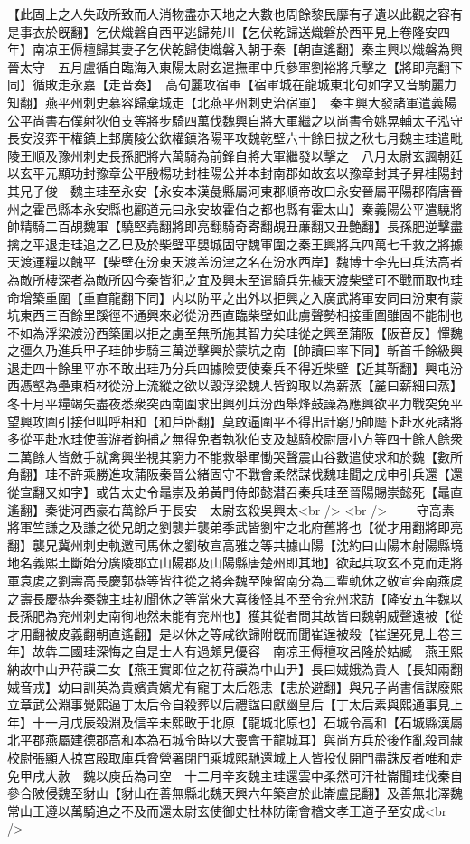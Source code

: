 【此固上之人失政所致而人消物盡亦天地之大數也周餘黎民靡有孑遺以此觀之容有是事衣於旣翻】乞伏熾磐自西平逃歸苑川【乞伏乾歸送熾磐於西平見上卷隆安四年】南凉王傉檀歸其妻子乞伏乾歸使熾磐入朝于秦【朝直遙翻】秦主興以熾磐為興晉太守　五月盧循自臨海入東陽太尉玄遣撫軍中兵參軍劉裕將兵擊之【將即亮翻下同】循敗走永嘉【走音奏】　高句麗攻宿軍【宿軍城在龍城東北句如字又音駒麗力知翻】燕平州刺史慕容歸棄城走【北燕平州刺史治宿軍】　秦主興大發諸軍遣義陽公平尚書右僕射狄伯支等將步騎四萬伐魏興自將大軍繼之以尚書令姚晃輔太子泓守長安沒弈干權鎮上邽廣陵公欽權鎮洛陽平攻魏乾壁六十餘日拔之秋七月魏主珪遣毗陵王順及豫州刺史長孫肥將六萬騎為前鋒自將大軍繼發以擊之　八月太尉玄諷朝廷以玄平元顯功封豫章公平殷楊功封桂陽公并本封南郡如故玄以豫章封其子昇桂陽封其兄子俊　魏主珪至永安【永安本漢彘縣屬河東郡順帝改曰永安晉屬平陽郡隋唐晉州之霍邑縣本永安縣也酈道元曰永安故霍伯之都也縣有霍太山】秦義陽公平遣驍將帥精騎二百覘魏軍【驍堅堯翻將即亮翻騎奇寄翻覘丑亷翻又丑艶翻】長孫肥逆擊盡擒之平退走珪追之乙巳及於柴壁平嬰城固守魏軍圍之秦王興將兵四萬七千救之將據天渡運糧以餽平【柴壁在汾東天渡盖汾津之名在汾水西岸】魏博士李先曰兵法高者為敵所棲深者為敵所囚今秦皆犯之宜及興未至遣騎兵先據天渡柴壁可不戰而取也珪命增築重圍【重直龍翻下同】内以防平之出外以拒興之入廣武將軍安同曰汾東有蒙坑東西三百餘里蹊徑不通興來必從汾西直臨柴壁如此虜聲勢相接重圍雖固不能制也不如為浮梁渡汾西築圍以拒之虜至無所施其智力矣珪從之興至蒲阪【阪音反】憚魏之彊久乃進兵甲子珪帥步騎三萬逆擊興於蒙坑之南【帥讀曰率下同】斬首千餘級興退走四十餘里平亦不敢出珪乃分兵四據險要使秦兵不得近柴壁【近其靳翻】興屯汾西憑壑為壘東栢材從汾上流縱之欲以毁浮梁魏人皆鈎取以為薪蒸【麄曰薪細曰蒸】冬十月平糧竭矢盡夜悉衆突西南圍求出興列兵汾西舉烽鼓譟為應興欲平力戰突免平望興攻圍引接但叫呼相和【和戶卧翻】莫敢逼圍平不得出計窮乃帥麾下赴水死諸將多從平赴水珪使善游者鉤捕之無得免者執狄伯支及越騎校尉唐小方等四十餘人餘衆二萬餘人皆斂手就禽興坐視其窮力不能救舉軍慟哭聲震山谷數遣使求和於魏【數所角翻】珪不許乘勝進攻蒲阪秦晉公緒固守不戰會柔然謀伐魏珪聞之戊申引兵還【還從宣翻又如字】或告太史令鼂崇及弟黃門侍郎懿潜召秦兵珪至晉陽賜崇懿死【鼂直遙翻】秦徙河西豪右萬餘戶于長安　太尉玄殺吳興太<br />
<br />
　　守高素將軍竺謙之及謙之從兄朗之劉襲并襲弟季武皆劉牢之北府舊將也【從才用翻將即亮翻】襲兄冀州刺史軌邀司馬休之劉敬宣高雅之等共據山陽【沈約曰山陽本射陽縣境地名義熙土斷始分廣陵郡立山陽郡及山陽縣唐楚州即其地】欲起兵攻玄不克而走將軍袁䖍之劉壽高長慶郭恭等皆往從之將奔魏至陳留南分為二輩軌休之敬宣奔南燕䖍之壽長慶恭奔秦魏主珪初聞休之等當來大喜後怪其不至令兖州求訪【隆安五年魏以長孫肥為兖州刺史南徇地然未能有兖州也】獲其從者問其故皆曰魏朝威聲遠被【從才用翻被皮義翻朝直遙翻】是以休之等咸欲歸附旣而聞崔逞被殺【崔逞死見上卷三年】故犇二國珪深悔之自是士人有過頗見優容　南凉王傉檀攻呂隆於姑臧　燕王熙納故中山尹苻謨二女【燕王實即位之初苻謨為中山尹】長曰娀娥為貴人【長知兩翻娀音戎】幼曰訓英為貴嬪貴嬪尤有寵丁太后怨恚【恚於避翻】與兄子尚書信謀廢熙立章武公淵事覺熙逼丁太后令自殺葬以后禮諡曰獻幽皇后【丁太后素與熙通事見上年】十一月戊辰殺淵及信辛未熙畋于北原【龍城北原也】石城令高和【石城縣漢屬北平郡燕屬建德郡高和本為石城令時以大喪會于龍城耳】與尚方兵於後作亂殺司隸校尉張顯人掠宫殿取庫兵脅營署閉門乘城熙馳還城上人皆投仗開門盡誅反者唯和走免甲戌大赦　魏以庾岳為司空　十二月辛亥魏主珪還雲中柔然可汗社崙聞珪伐秦自參合陂侵魏至豺山【豺山在善無縣北魏天興六年築宫於此崙盧昆翻】及善無北澤魏常山王遵以萬騎追之不及而還太尉玄使御史杜林防衛會稽文孝王道子至安成<br />
